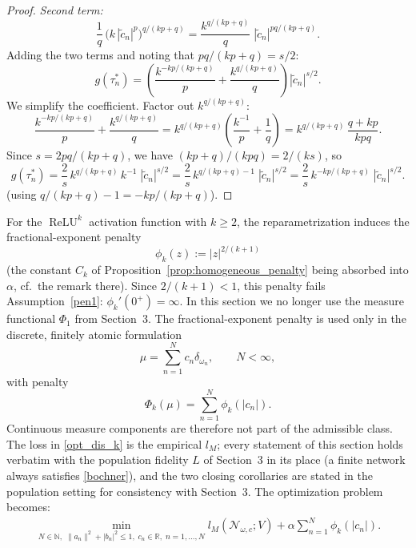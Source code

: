 \documentclass[11pt]{amsart}
\theoremstyle{definition}
\theoremstyle{remark}
\DeclareMathOperator{\relu}{ReLU}
\newcommand{\reluk}{\relu^{k}}
\begin{document}
\begin{proof}
\emph{Second term:}
\begin{equation*}
	\frac{1}{q}\,\bigl(k\,|\tilde c_n|^p\bigr)^{q/(kp+q)}
	= \frac{k^{q/(kp+q)}}{q}\;|\tilde c_n|^{pq/(kp+q)}.
\end{equation*}
Adding the two terms and noting that $pq/(kp+q) = s/2$:
\begin{equation*}
	g(\tau_n^*)
	= \left(\frac{k^{-kp/(kp+q)}}{p} + \frac{k^{q/(kp+q)}}{q}\right) |\tilde c_n|^{s/2}.
\end{equation*}
We simplify the coefficient. Factor out $k^{q/(kp+q)}$:
\begin{equation*}
	\frac{k^{-kp/(kp+q)}}{p} + \frac{k^{q/(kp+q)}}{q}
	= k^{q/(kp+q)}\!\left(\frac{k^{-1}}{p} + \frac{1}{q}\right)
	= k^{q/(kp+q)}\,\frac{q + kp}{kpq}.
\end{equation*}
Since $s = 2pq/(kp+q)$, we have $(kp+q)/(kpq) = 2/(ks)$, so
\begin{equation*}
	g(\tau_n^*) = \frac{2}{s}\,k^{q/(kp+q)}\,k^{-1}\;|\tilde c_n|^{s/2}
	= \frac{2}{s}\,k^{q/(kp+q) - 1}\;|\tilde c_n|^{s/2}
	= \frac{2}{s}\,k^{-kp/(kp+q)}\;|\tilde c_n|^{s/2}.
\end{equation*}
(using $q/(kp+q) - 1 = -kp/(kp+q)$).
\end{proof}

For the $\reluk$ activation function with $k \ge 2$, the reparametrization induces the fractional-exponent penalty
\begin{equation*}
	\phi_k(z) := |z|^{2/(k+1)}
\end{equation*}
(the constant $C_k$ of Proposition~\ref{prop:homogeneous_penalty} being absorbed into $\alpha$, cf.\ the remark there). Since $2/(k+1) < 1$, this penalty fails Assumption~\ref{pen1}: $\phi_k'(0^+) = \infty$. 
In this section we no longer use the measure functional $\Phi_1$ from
Section~3. The fractional-exponent penalty is used only in the discrete,
finitely atomic formulation
\begin{equation*}
	\mu = \sum_{n=1}^N c_n \delta_{\omega_n}, \qquad N < \infty,
\end{equation*}
with penalty
\begin{equation*}
	\Phi_k(\mu) = \sum_{n=1}^N \phi_k(|c_n|).
\end{equation*}
Continuous measure components are therefore not part of the admissible class.
The loss in \eqref{opt_dis_k} is the empirical $l_M$; every statement of this
section holds verbatim with the population fidelity $L$ of Section~3 in its
place (a finite network always satisfies \eqref{bochner}), and the two closing
corollaries are stated in the population setting for consistency with Section~3.
The optimization problem becomes:
\begin{equation}
\label{opt_dis_k}
\begin{aligned}
		\min_{N \in \mathbb{N},\; \|a_n\|^2 + |b_n|^2 \le 1,\; c_n \in \mathbb{R},\; n = 1, \dots, N} l_M(\mathcal{N}_{\omega, c}; V) + \alpha \sum_{n = 1}^N \phi_k(|c_n|).
\end{aligned}
\end{equation}
\end{document}
